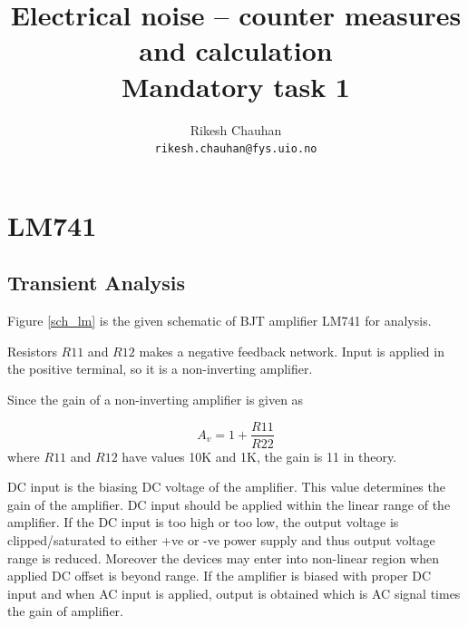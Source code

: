 \documentclass[12pt,a4paper,UKenglish]{article}
\title{Electrical noise – counter measures and calculation\\
Mandatory task 1}
\author{Rikesh Chauhan\\ 
\texttt{rikesh.chauhan@fys.uio.no}}
\date{}
\begin{document}
\maketitle

\section{LM741}
\subsection{Transient Analysis}
Figure \ref{sch_lm} is the given schematic of BJT amplifier LM741 for analysis.

Resistors $R11$ and $R12$ makes a negative feedback network. Input is applied in the positive terminal, so it is a non-inverting amplifier. 

Since the gain of a non-inverting amplifier is given as 

\begin{equation*}
A_v = 1 + \frac{R11}{R22}
\end{equation*}
 where $R11$ and $R12$ have values 10K and 1K, the gain is 11 in theory.

DC input is the biasing DC voltage of the amplifier. This value determines the gain of the amplifier. DC input should be applied within the linear range of the amplifier. If the DC input is too high or too low, the output voltage is clipped/saturated to either +ve or -ve power supply and thus output voltage range is reduced. Moreover the devices may enter into non-linear region when applied DC offset is beyond range. If the amplifier is biased with proper DC input and  when AC input is applied, output is obtained which is AC signal times the gain of amplifier. \\ 
\end{document}
